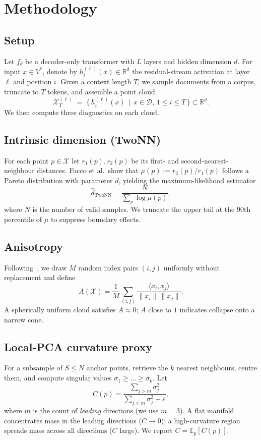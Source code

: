 \section{Methodology}\label{sec:method}

\subsection{Setup}
Let $f_\theta$ be a decoder-only transformer with $L$ layers and hidden
dimension $d$. For input $x \in V^*$, denote by $h^{(\ell)}_i(x) \in
\mathbb{R}^d$ the residual-stream activation at layer $\ell$ and position $i$.
Given a context length $T$, we sample documents from a corpus, truncate to
$T$ tokens, and assemble a point cloud
\[
\mathcal{X}^{(\ell)}_T \;=\; \{\, h^{(\ell)}_i(x) \,\mid\, x \in \mathcal{D},\, 1\le i \le T \,\}\subset \mathbb{R}^d.
\]
We then compute three diagnostics on each cloud.

\subsection{Intrinsic dimension (TwoNN)}
For each point $p \in \mathcal{X}$ let $r_1(p), r_2(p)$ be its first- and
second-nearest-neighbour distances. Facco et al.\ show that
$\mu(p) := r_2(p)/r_1(p)$ follows a Pareto distribution with parameter $d$,
yielding the maximum-likelihood estimator
\begin{equation}
\hat{d}_{\mathrm{TwoNN}} = \frac{N}{\sum_{p} \log\mu(p)},
\label{eq:twonn}
\end{equation}
where $N$ is the number of valid samples. We truncate the upper tail at the
$90$th percentile of $\mu$ to suppress boundary effects.

\subsection{Anisotropy}
Following~\cite{ethayarajh2019contextual}, we draw $M$ random index pairs
$(i,j)$ uniformly without replacement and define
\begin{equation}
A(\mathcal{X}) = \frac{1}{M}\sum_{(i,j)}\frac{\langle x_i, x_j\rangle}{\lVert x_i\rVert\,\lVert x_j\rVert}.
\label{eq:aniso}
\end{equation}
A spherically uniform cloud satisfies $A \approx 0$; $A$ close to $1$
indicates collapse onto a narrow cone.

\subsection{Local-PCA curvature proxy}
For a subsample of $S \le N$ anchor points, retrieve the $k$ nearest
neighbours, centre them, and compute singular values
$\sigma_1 \ge \dots \ge \sigma_k$. Let
\begin{equation}
C(p) = \frac{\sum_{j>m}\sigma_j^2}{\sum_{j\le m}\sigma_j^2 + \varepsilon},
\label{eq:curv}
\end{equation}
where $m$ is the count of \emph{leading} directions (we use $m=3$). A flat
manifold concentrates mass in the leading directions ($C\to 0$); a
high-curvature region spreads mass across all directions ($C$ large).
We report $\overline{C} = \mathbb{E}_p[C(p)]$.

